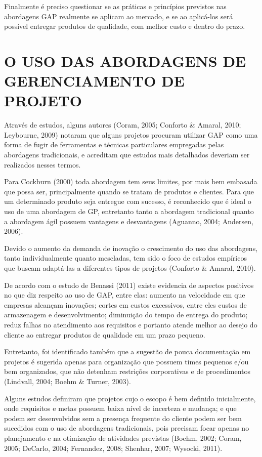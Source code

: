 Finalmente é preciso questionar se as práticas e princípios previstos nas abordagens GAP realmente se aplicam ao mercado, e se ao aplicá-los será possível entregar produtos de qualidade, com melhor custo e dentro do prazo.


\section{O USO DAS ABORDAGENS DE GERENCIAMENTO DE PROJETO}

Através de estudos, alguns autores (Coram, 2005; Conforto \& Amaral, 2010; Leybourne, 2009) notaram que alguns projetos procuram utilizar GAP como uma forma de fugir de ferramentas e técnicas particulares empregadas pelas abordagens tradicionais, e acreditam que estudos mais detalhados deveriam ser realizados nesses termos.

Para Cockburn (2000) toda abordagem tem seus limites, por mais bem embasada que possa ser, principalmente quando se tratam de produtos e clientes. Para que um determinado produto seja entregue com sucesso, é reconhecido que é ideal o uso de uma abordagem de GP, entretanto tanto a abordagem tradicional quanto a abordagem ágil possuem vantagens e desvantagens (Aguanno, 2004; Andersen, 2006).

Devido o aumento da demanda de inovação o crescimento do uso das abordagens, tanto individualmente quanto mescladas, tem sido o foco de estudos empíricos que buscam adaptá-las a diferentes tipos de projetos (Conforto \& Amaral, 2010).

De acordo com o estudo de Benassi (2011) existe evidencia de aspectos positivos no que diz respeito ao uso de GAP, entre elas: aumento na velocidade em que empresas alcançam inovações; cortes em custos excessivos, entre eles custos de armazenagem e desenvolvimento; diminuição do tempo de entrega do produto; reduz falhas no atendimento aos requisitos e portanto atende melhor ao desejo do cliente ao entregar produtos de qualidade em um prazo pequeno.

Entretanto, foi identificado também que a sugestão de pouca documentação em projetos é sugerida apenas para organização que possuem times pequenos e/ou bem organizados, que não detenham restrições corporativas e de procedimentos (Lindvall, 2004; Boehm \& Turner, 2003).

Alguns estudos definiram que projetos cujo o escopo é bem definido inicialmente, onde requisitos e metas possuem baixa nível de incerteza e mudança; e que podem ser desenvolvidos sem a presença frequente do cliente podem ser bem sucedidos com o uso de abordagens tradicionais, pois precisam focar apenas no planejamento e na otimização de atividades previstas (Boehm, 2002; Coram, 2005; DeCarlo, 2004; Fernandez, 2008; Shenhar, 2007; Wysocki, 2011).

